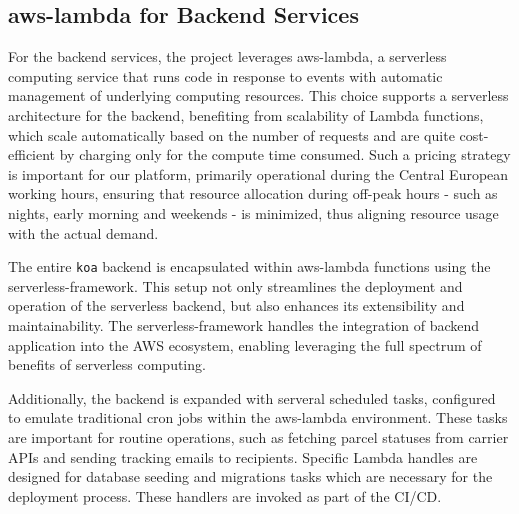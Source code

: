 \subsection{\gls{aws-lambda} for Backend Services}
\label{subsec:aws-lambda-backend}
For the backend services, the project leverages \gls{aws-lambda}, a serverless computing service that runs code in response to events with automatic management of underlying computing resources.
This choice supports a serverless architecture for the backend, benefiting from scalability of Lambda functions, which scale automatically based on the number of requests and are quite cost-efficient by charging only for the compute time consumed.
Such a pricing strategy is important for our platform, primarily operational during the Central European working hours, ensuring that resource allocation during off-peak hours - such as nights, early morning and weekends - is minimized, thus aligning resource usage with the actual demand.

The entire \texttt{\gls{koa}} backend is encapsulated within \gls{aws-lambda} functions using the \gls{serverless-framework}.
This setup not only streamlines the deployment and operation of the serverless backend, but also enhances its extensibility and maintainability.
The \gls{serverless-framework} handles the integration of backend application into the \ac{AWS} ecosystem, enabling leveraging the full spectrum of benefits of serverless computing.

Additionally, the backend is expanded with serveral scheduled tasks, configured to emulate traditional cron jobs within the \gls{aws-lambda} environment.
These tasks are important for routine operations, such as fetching parcel statuses from carrier APIs and sending tracking emails to recipients.
Specific Lambda handles are designed for database seeding and migrations tasks which are necessary for the deployment process.
These handlers are invoked as part of the \ac{CI}/\ac{CD}.

